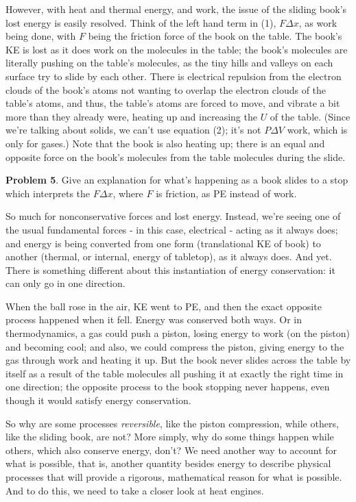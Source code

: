 \documentclass[12pt]{article}
\begin{document}
However, with heat and thermal energy, and work, the issue of the sliding book's lost energy is easily resolved. Think of the left hand term in (1), $F\Delta x$, as work being done, with $F$ being the friction force of the book on the table. The book's KE is lost as it does work on the molecules in the table; the book's molecules are literally pushing on the table's molecules, as the tiny hills and valleys on each surface try to slide by each other. There is electrical repulsion from the electron clouds of the book's atoms not wanting to overlap the electron clouds of the table's atoms, and thus, the table's atoms are forced to move, and vibrate a bit more than they already were, heating up and increasing the $U$ of the table. (Since we're talking about solids, we can't use equation (2); it's not $P\Delta V$ work, which is only for gases.)  Note that the book is also heating up; there is an equal and opposite force on the book's molecules from the table molecules during the slide. 

\textbf{Problem 5}. Give an explanation for what's happening as a book slides to a stop which interprets the $F\Delta x$, where $F$ is friction, as PE instead of work.

So much for nonconservative forces and lost energy. Instead, we're seeing one of the usual fundamental forces - in this case, electrical - acting as it always does; and energy is being converted from one form (translational KE of book) to another (thermal, or internal, energy of tabletop), as it always does. And yet. There is something different about this instantiation of energy conservation: it can only go in one direction. 

When the ball rose in the air, KE went to PE, and then the exact opposite process happened when it fell. Energy was conserved both ways. Or in thermodynamics, a gas could push a piston, losing energy to work (on the piston) and becoming cool; and also, we could compress the piston, giving energy to the gas through work and heating it up. But the book never slides across the table by itself as a result of the table molecules all pushing it at exactly the right time in one direction; the opposite process to the book stopping never happens, even though it would satisfy energy conservation. 

So why are some processes \textit{reversible}, like the piston compression, while others, like the sliding book, are not? More simply, why do some things happen while others, which also conserve energy, don't? We need another way to account for what is possible, that is, another quantity besides energy to describe physical processes that will provide a rigorous, mathematical reason for what is possible. And to do this, we need to take a closer look at heat engines.
\end{document}
